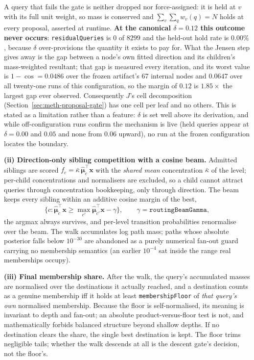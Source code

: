 A query that fails the gate is neither dropped nor force-assigned: it is held at $v$ with
its full unit weight, so mass is conserved and $\sum_v \sum_q w_v(q) = N$ holds at every
proposal, asserted at runtime.
\textbf{At the canonical $\delta = 0.12$ this outcome never occurs}:
\texttt{residualQueries} is $0$ of $8299$ and the held-out hold rate is $0.00\%$, because
$\delta$ over-provisions the quantity it exists to pay for.
What the Jensen step gives away is the gap between a node's own fitted direction and its
children's mass-weighted resultant; that gap is measured every iteration, and its worst
value is $1 - \cos = 0.0486$ over the frozen artifact's 67 internal nodes and $0.0647$
over all twenty-one runs of this configuration, so the margin of $0.12$ is $1.85\times$
the largest gap ever observed.
Consequently $J$'s cell decomposition (Section~\ref{sec:meth-proposal-gate}) has one cell
per leaf and no others.
This is stated as a limitation rather than a feature: $\delta$ is set well above its
derivation, and while off-configuration runs confirm the mechanism is live (held queries
appear at $\delta = 0.00$ and $0.05$ and none from $0.06$ upward), no run at the frozen
configuration locates the boundary.

\textbf{(ii) Direction-only sibling competition with a cosine beam.}
Admitted siblings are scored
$f_c = \bar{\kappa}\,\hat{\boldsymbol{\mu}}_c^\top \mathbf{x}$ with the \emph{shared
mean} concentration $\bar{\kappa}$ of the level; per-child concentrations and normalisers
are excluded, so a child cannot attract queries through concentration bookkeeping, only
through direction.
The beam keeps every sibling within an additive cosine margin of the best,
\[
\Big\{ c :
\hat{\boldsymbol{\mu}}_c^\top \mathbf{x}
\geq
\max_{c'} \hat{\boldsymbol{\mu}}_{c'}^\top \mathbf{x} - \gamma
\Big\},
\qquad \gamma = \texttt{routingBeamGamma},
\]
the argmax always survives, and per-level transition probabilities renormalise over the
beam.
The walk accumulates log path mass; paths whose absolute posterior falls below
$10^{-30}$ are abandoned as a purely numerical fan-out guard carrying no membership
semantics (an earlier $10^{-4}$ sat inside the range real memberships occupy).

\textbf{(iii) Final membership share.}
After the walk, the query's accumulated masses are normalised over the destinations it
actually reached, and a destination counts as a genuine membership iff it holds at least
\texttt{membershipFloor} of \emph{that query's own} normalised membership.
Because the floor is self-normalised, its meaning is invariant to depth and fan-out; an
absolute product-versus-floor test is not, and mathematically forbids balanced structure
beyond shallow depths.
If no destination clears the share, the single best destination is kept. The floor trims
negligible tails; whether the walk descends at all is the descent gate's decision, not
the floor's.

